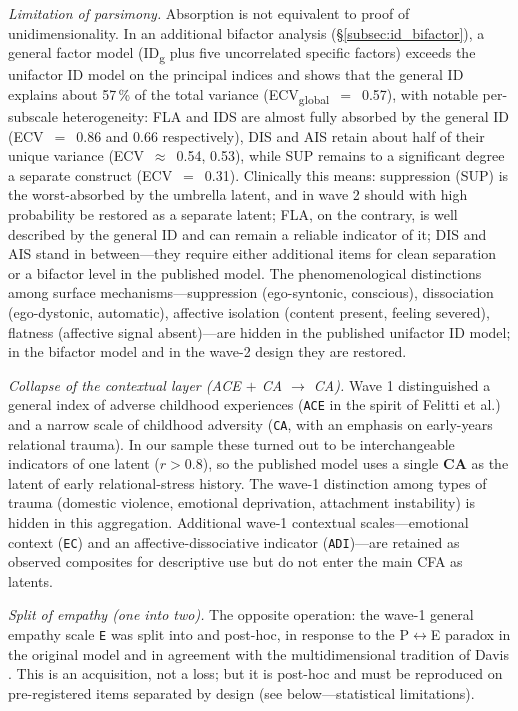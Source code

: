 \emph{Limitation of parsimony.} Absorption is not equivalent to proof of unidimensionality. In an additional bifactor analysis (§\ref{subsec:id_bifactor}), a general factor model (ID\textsubscript{g} plus five uncorrelated specific factors) exceeds the unifactor ID model on the principal indices and shows that the general ID explains about 57\,\% of the total variance (ECV\textsubscript{global}~$=$~0.57), with notable per-subscale heterogeneity: FLA and IDS are almost fully absorbed by the general ID (ECV~$=$~0.86 and 0.66 respectively), DIS and AIS retain about half of their unique variance (ECV~$\approx$~0.54, 0.53), while SUP remains to a significant degree a separate construct (ECV~$=$~0.31). Clinically this means: suppression (SUP) is the worst-absorbed by the umbrella latent, and in wave 2 should with high probability be restored as a separate latent; FLA, on the contrary, is well described by the general ID and can remain a reliable indicator of it; DIS and AIS stand in between---they require either additional items for clean separation or a bifactor level in the published model. The phenomenological distinctions among surface mechanisms---suppression (ego-syntonic, conscious), dissociation (ego-dystonic, automatic), affective isolation (content present, feeling severed), flatness (affective signal absent)---are hidden in the published unifactor ID model; in the bifactor model and in the wave-2 design they are restored.

\emph{Collapse of the contextual layer (ACE $+$ CA $\to$ CA).} Wave 1 distinguished a general index of adverse childhood experiences (\texttt{ACE} in the spirit of Felitti et al.) and a narrow scale of childhood adversity (\texttt{CA}, with an emphasis on early-years relational trauma). In our sample these turned out to be interchangeable indicators of one latent ($r > 0.8$), so the published model uses a single \textbf{CA} as the latent of early relational-stress history. The wave-1 distinction among types of trauma (domestic violence, emotional deprivation, attachment instability) is hidden in this aggregation. Additional wave-1 contextual scales---emotional context (\texttt{EC}) and an affective-dissociative indicator (\texttt{ADI})---are retained as observed composites for descriptive use but do not enter the main CFA as latents.

\emph{Split of empathy (one into two).} The opposite operation: the wave-1 general empathy scale \texttt{E} was split into \EAF{} and \Ecog{} post-hoc, in response to the P$\leftrightarrow$E paradox in the original model and in agreement with the multidimensional tradition of Davis \citep{davis1983}. This is an acquisition, not a loss; but it is post-hoc and must be reproduced on pre-registered items separated by design (see below---statistical limitations).

